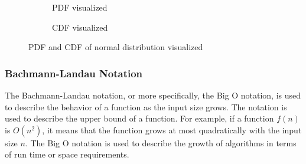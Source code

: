\begin{figure}[H]
  \begin{subfigure}[b]{0.4\textwidth}
    \centering
    \caption{PDF visualized}
    \label{fig:pdf-theory}
  \end{subfigure}
  \hfill
  \begin{subfigure}[b]{0.4\textwidth}
    \centering
    \caption{CDF visualized}
    \label{fig:cdf-theory}
  \end{subfigure}
  \caption{\gls{PDF} and \gls{CDF} of normal distribution visualized}
  \label{fig:probability-theory}
\end{figure}

\subsubsection{Bachmann-Landau Notation}

The Bachmann-Landau notation, or more specifically, the Big O notation, is used to describe the behavior of a function as the input size grows. The notation is used to describe the upper bound of a function. For example, if a function $f(n)$ is $O(n^2)$, it means that the function grows at most quadratically with the input size $n$. The Big O notation is used to describe the growth of algorithms in terms of run time or space requirements.

